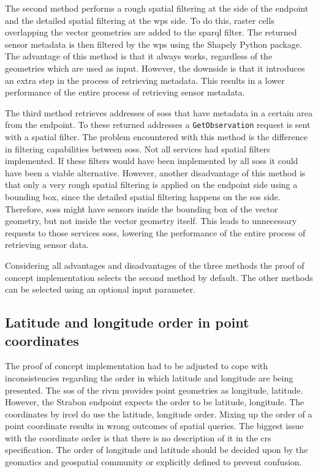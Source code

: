 The second method performs a rough spatial filtering at the side of the endpoint and the detailed spatial filtering at the \ac{wps} side. To do this, raster cells overlapping the vector geometries are added to the \ac{sparql} filter. The returned sensor metadata is then filtered by the \ac{wps} using the Shapely Python package. The advantage of this method is that it always works, regardless of the geometries which are used as input. However, the downside is that it introduces an extra step in the process of retrieving metadata. This results in a lower performance of the entire process of retrieving sensor metadata.  

The third method retrieves addresses of \aclp{sos} that have metadata in a certain area from the endpoint. To these returned addresses a \texttt{GetObservation} request is sent with a spatial filter. The problem encountered with this method is the difference in filtering capabilities between \aclp{sos}. Not all services had spatial filters implemented. If these filters would have been implemented by all \aclp{sos} it could have been a viable alternative. However, another disadvantage of this method is that only a very rough spatial filtering is applied on the endpoint side using a bounding box, since the detailed spatial filtering happens on the \ac{sos} side. Therefore, \aclp{sos} might have sensors inside the bounding box of the vector geometry, but not inside the vector geometry itself. This leads to unnecessary requests to those services \aclp{sos}, lowering the performance of the entire process of retrieving sensor data.

Considering all advantages and disadvantages of the three methods the proof of concept implementation selects the second method by default. The other methods can be selected using an optional input parameter. 

\subsection{Latitude and longitude order in point coordinates}
The proof of concept implementation had to be adjusted to cope with inconsistencies regarding the order in which latitude and longitude are being presented. The \ac{sos} of the \ac{rivm} provides point geometries as longitude, latitude. However, the Strabon endpoint expects the order to be latitude, longitude. The coordinates by \ac{ircel} do use the latitude, longitude order. Mixing up the order of a point coordinate results in wrong outcomes of spatial queries. The biggest issue with the coordinate order is that there is no description of it in the \ac{crs} specification.  The order of longitude and latitude should be decided upon by the geomatics and geospatial community or explicitly defined to prevent confusion. 

